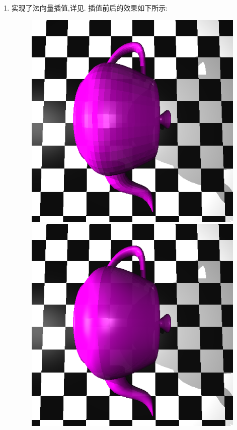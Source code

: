 \begin{enumerate}
\begin{figure}[H]
\begin{minipage}[b]{0.46\linewidth}
      \end{minipage}
      \caption*{\label{fig:kdtree_bug}}
    \end{figure}

  \item 实现了法向量插值,详见. 插值前后的效果如下所示:
    \begin{figure}[H]
      \begin{minipage}[b]{0.46\linewidth}
        \centering
        \includegraphics[width=\textwidth]{img/rough.png}
      \end{minipage}
      \begin{minipage}[b]{0.46\linewidth}
        \centering
        \includegraphics[width=\textwidth]{img/smooth.png}

\end{minipage}
\end{figure}
\end{enumerate}
